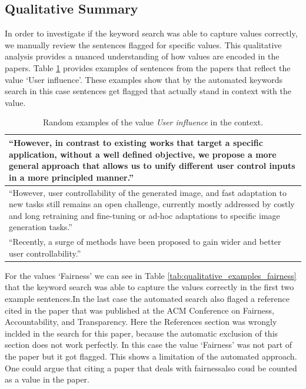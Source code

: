 \documentclass{article}
\begin{document}
\subsection{Qualitative Summary}
In order to investigate if the keyword search was able to capture values correctly, we manually review 
the sentences flagged for specific values. This qualitative analysis provides a nuanced understanding of how values are encoded in the papers. 
Table \ref{tab:qualitative_examples_user_influence} provides examples of sentences from the papers that reflect the value `User influence'. These
examples show that by the automated keywords search in this case sentences get flagged that actually stand in context with the value. 
\begin{table}[H]
    \centering
    \begin{tabular}{p{12cm}}
        \toprule
        ``However, in contrast to existing works that target a specific application, without a well defined objective, we propose a more general approach that allows us to unify different user control inputs in a more principled manner.'' \\
        \midrule
        ``However, user controllability of the generated image, and fast adaptation to new tasks still remains an open challenge, currently mostly addressed by costly and long retraining and fine-tuning or ad-hoc adaptations to specific image generation tasks.'' \\
        \midrule
        ``Recently, a surge of methods have been proposed to gain wider and better user controllability.'' \\
        \bottomrule
    \end{tabular}
    \caption{Random examples of the value \textit{User influence} in the context.}
    \label{tab:qualitative_examples_user_influence}
\end{table}

For the values `Fairness' we can see in Table \ref{tab:qualitative_examples_fairness} that the keyword search was able to capture the values correctly 
in the first two example sentences.In the last case the automated search also flaged a reference cited in the paper that was published at the 
ACM Conference on Fairness, Accountability, and Transparency. Here the References section was wrongly inclded in the search for this paper, because
the automatic exclusion of this section does not work perfectly. In this case the value `Fairness' was not part of the paper but it got flagged. 
This shows a limitation of the automated approach. One could argue that citing a paper that deals with fairnessalso coud be counted as a value in the paper.  
\end{document}
